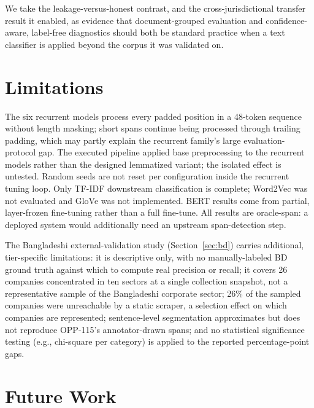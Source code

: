 \documentclass[11pt]{article}
\begin{document}
We take the leakage-versus-honest contrast, and the cross-jurisdictional transfer result it enabled, as evidence that document-grouped evaluation and confidence-aware, label-free diagnostics should both be standard practice when a text classifier is applied beyond the corpus it was validated on.

\section{Limitations}

The six recurrent models process every padded position in a 48-token sequence without length masking; short spans continue being processed through trailing padding, which may partly explain the recurrent family's large evaluation-protocol gap. The executed pipeline applied base preprocessing to the recurrent models rather than the designed lemmatized variant; the isolated effect is untested. Random seeds are not reset per configuration inside the recurrent tuning loop. Only TF-IDF downstream classification is complete; Word2Vec was not evaluated and GloVe was not implemented. BERT results come from partial, layer-frozen fine-tuning rather than a full fine-tune. All results are oracle-span: a deployed system would additionally need an upstream span-detection step.

The Bangladeshi external-validation study (Section~\ref{sec:bd}) carries additional, tier-specific limitations: it is descriptive only, with no manually-labeled BD ground truth against which to compute real precision or recall; it covers 26 companies concentrated in ten sectors at a single collection snapshot, not a representative sample of the Bangladeshi corporate sector; 26\% of the sampled companies were unreachable by a static scraper, a selection effect on which companies are represented; sentence-level segmentation approximates but does not reproduce OPP-115's annotator-drawn spans; and no statistical significance testing (e.g., chi-square per category) is applied to the reported percentage-point gaps.

\section{Future Work}
\label{sec:future}
\end{document}
